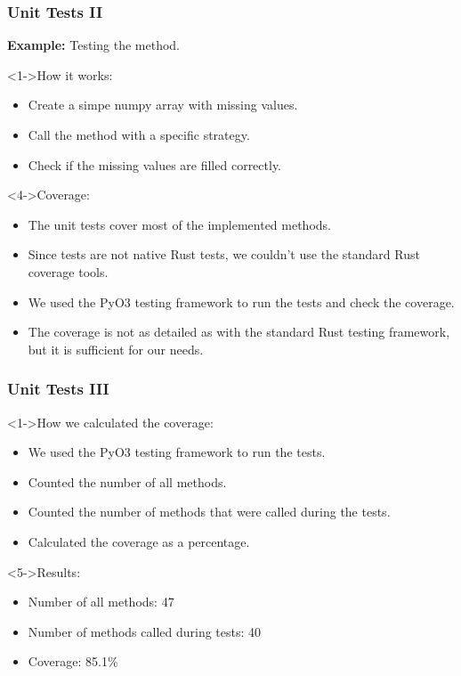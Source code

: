 \documentclass[t,english]{beamer}
\begin{document}
\begin{frame}
  \frametitle{Unit Tests II}
  \textbf{Example:} Testing the \impute method.

  \begin{block}<1->{How it works:}
    \begin{itemize}
      \item<1-> Create a simpe numpy array with missing values.
      \item<2-> Call the \impute method with a specific strategy.
      \item<3-> Check if the missing values are filled correctly.
    \end{itemize}
  \end{block}

  \begin{block}<4->{Coverage:}
    \begin{itemize}
      \item <4-> The unit tests cover most of the implemented methods.
      \item <5-> Since tests are not native Rust tests, we couldn't use the standard Rust coverage tools.
      \item <6-> We used the PyO3 testing framework to run the tests and check the coverage.
      \item <7-> The coverage is not as detailed as with the standard Rust testing framework, but it is sufficient for our needs.
    \end{itemize}
  \end{block}

\end{frame}

\begin{frame}
  \frametitle{Unit Tests III}
  \begin{block}<1->{How we calculated the coverage:}
    \begin{itemize}
      \item<1-> We used the PyO3 testing framework to run the tests.
      \item<2-> Counted the number of all methods.
      \item <3-> Counted the number of methods that were called during the tests.
      \item <4-> Calculated the coverage as a percentage.
    \end{itemize}
  \end{block}

  \begin{block}<5->{Results:}
    \begin{itemize}
      \item<5-> Number of all methods: 47
      \item <6-> Number of methods called during tests: 40
      \item <7-> Coverage: 85.1\%
    \end{itemize}
  \end{block}
\end{frame}
\end{document}
